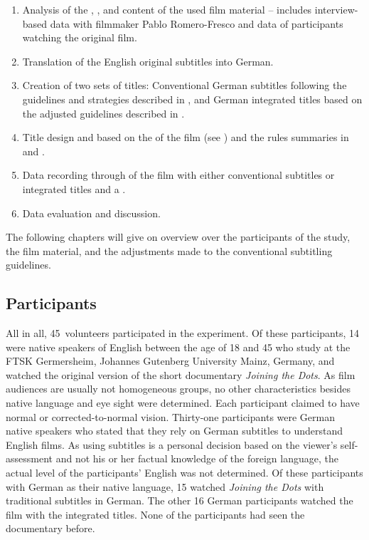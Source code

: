 \begin{enumerate}
\item Analysis of the , , and content of the used film material – includes interview-based data with filmmaker Pablo Ro\-me\-ro-Fresco and  data of participants watching the original film.
\item Translation of the English original subtitles into German.
\item Creation of two sets of titles: Conventional German subtitles following the guidelines and strategies described in , and German integrated titles based on the adjusted guidelines described in .
\item Title design and  based on the  of the film (see ) and the rules summaries in  and .
\item Data recording through  of the film with either conventional subtitles or integrated titles and a .
\item Data evaluation and discussion.
\end{enumerate}

The following chapters will give on overview over the participants of the study, the film material, and the adjustments made to the conventional subtitling guidelines.

\subsection{{Participants}}\label{sec:7.5.1}

All in all, 45~volunteers participated in the experiment. Of these participants, 14 were native speakers of English between the age of 18 and 45 who study at the FTSK Germersheim, Johannes Gutenberg University Mainz, Germany, and watched the original version of the short documentary \textit{Joining the Dots}. As film audiences are usually not homogeneous groups, no other characteristics besides native language and eye sight were determined. Each participant claimed to have normal or corrected-to-normal vision. Thirty-one participants were German native speakers who stated that they rely on German subtitles to understand English films. As using subtitles is a personal decision based on the viewer’s self-assessment and not his or her factual knowledge of the foreign language, the actual level of the participants’ English was not determined. Of these participants with German as their native language, 15 watched \textit{Joining the Dots} with traditional subtitles in German. The other 16 German participants watched the film with the integrated titles. None of the participants had seen the documentary before.

